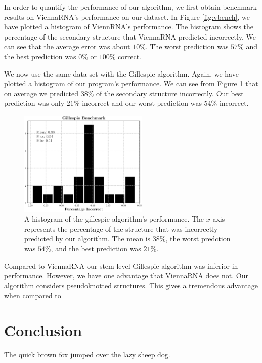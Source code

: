 \documentclass[11pt]{article}
\begin{document}
\begin{multicols}{2}
In order to quantify the performance of our algorithm, we first obtain benchmark results on ViennaRNA's performance on our dataset. In Figure \ref{fig:vbench}, we have plotted a histogram of ViennRNA's performance. The histogram shows the percentage of the secondary structure that ViennaRNA predicted incorrectly. We can see that the average error was about $10\%$. The worst prediction was $57\%$ and the best prediction was $0\%$ or $100\%$ correct.

We now use the same data set with the Gillespie algorithm. Again, we have plotted a histogram of our program's performance. We can see from Figure \ref{fig:gill} that on average we predicted $38\%$ of the secondary structure incorrectly. Our best prediction was only $21\%$ incorrect and our worst prediction was $54\%$ incorrect.

\begin{figure}[H]
\centering
\includegraphics[width = 0.55\textwidth]{fig/gill_bench}
\caption{A histogram of the gillespie algorithm's performance. The $x$-axis represents the percentage of the structure that was incorrectly predicted by our algorithm. The mean is $38 \%$, the worst predction  was $54\%$, and the best prediction was $21 \%$.}
\label{fig:gill}
\end{figure}

Compared to ViennaRNA our stem level Gillespie algorithm was inferior in performance. However, we have one advantage that ViennaRNA does not. Our algorithm considers pseudoknotted structures. This gives a tremendous advantage when compared to 
\end{multicols}


\section{Conclusion}
The quick brown fox jumped over the lazy sheep dog.
\newpage
\nocite{*}
\printbibliography
\end{document}
